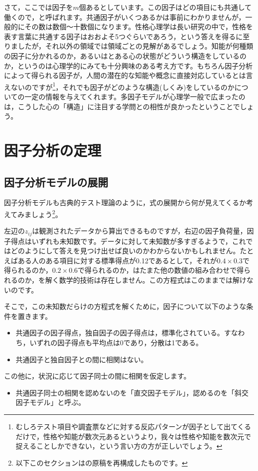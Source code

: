 \documentclass{ltjsbook}
\begin{document}
さて，ここでは因子を$m$個あるとしています。この因子はどの項目にも共通して働くので，と呼ばれます。共通因子がいくつあるかは事前にわかりませんが，一般的にその数は数個〜十数個になります。性格心理学は長い研究の中で，性格を表す言葉に共通する因子はおおよそ5つぐらいであろう，という答えを得るに至りましたが，それ以外の領域では領域ごとの見解があるでしょう。知能が何種類の因子に分かれるのか，あるいはとある心の状態がどういう構造をしているのか，というのは心理学的にみても十分興味のある考え方です。もちろん因子分析によって得られる因子が，人間の潜在的な知能や概念に直接対応しているとは言えないのですが\footnote{むしろテスト項目や調査票などに対する反応パターンが因子として出てくるだけで，性格や知能が数次元あるというより，我々は性格や知能を数次元で捉えることしかできない，という言い方の方が正しいでしょう。}，それでも因子がどのような構造(しくみ)をしているのかについての一定の情報を与えてくれます。多因子モデルが心理学一般で広まったのは，こうした心の「構造」に注目する学問との相性が良かったということでしょう。

\section{因子分析の定理}
\subsection{因子分析モデルの展開}
因子分析モデルも古典的テスト理論のように，式の展開から何が見えてくるか考えてみましょう\footnote{以下このセクションは\citet{kosugi2018}の原稿を再構成したものです。}。

左辺の$z_{ij}$は観測されたデータから算出できるものですが，右辺の因子負荷量，因子得点はいずれも未知数です。データに対して未知数が多すぎるようで，これではどのようにして答えを見つけ出せば良いのかわからないかもしれません。たとえばある人のある項目に対する標準得点が0.12であるとして，それが$0.4 \times 0.3$で得られるのか，$0.2 \times 0.6$で得られるのか，はたまた他の数値の組み合わせで得られるのか，を解く数学的技術は存在しません。この方程式はこのままでは解けないのです。

そこで，この未知数だらけの方程式を解くために，因子について以下のような条件を置きます。
\begin{itemize}
    \item 共通因子の因子得点，独自因子の因子得点は，標準化されている。すなわち，いずれの因子得点も平均点は0であり，分散は1である。
    \item 共通因子と独自因子との間に相関はない。
\end{itemize}
この他に，状況に応じて因子同士の間に相関を仮定します。
\begin{itemize}
    \item 共通因子同士の相関を認めないのを「直交因子モデル」，認めるのを「斜交因子モデル」と呼ぶ。
\end{itemize}
\end{document}
